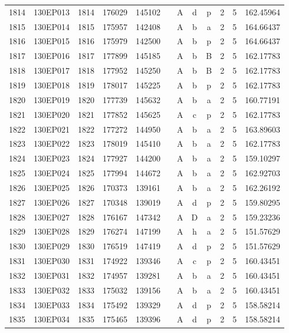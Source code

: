 \begin{tabular}{|*{12}{c|}}
1814 & 130EP013 & 1814 & 176029 & 145102 &  & A & d & p & 2 & 5 & 162.45964 \\ 
1815 & 130EP014 & 1815 & 175957 & 142408 &  & A & b & a & 2 & 5 & 164.66437 \\ 
1816 & 130EP015 & 1816 & 175979 & 142500 &  & A & b & p & 2 & 5 & 164.66437 \\ 
1817 & 130EP016 & 1817 & 177899 & 145185 &  & A & b & B & 2 & 5 & 162.17783 \\ 
1818 & 130EP017 & 1818 & 177952 & 145250 &  & A & b & B & 2 & 5 & 162.17783 \\ 
1819 & 130EP018 & 1819 & 178017 & 145225 &  & A & b & p & 2 & 5 & 162.17783 \\ 
1820 & 130EP019 & 1820 & 177739 & 145632 &  & A & b & a & 2 & 5 & 160.77191 \\ 
1821 & 130EP020 & 1821 & 177852 & 145625 &  & A & c & p & 2 & 5 & 162.17783 \\ 
1822 & 130EP021 & 1822 & 177272 & 144950 &  & A & b & a & 2 & 5 & 163.89603 \\ 
1823 & 130EP022 & 1823 & 178019 & 145410 &  & A & b & a & 2 & 5 & 162.17783 \\ 
1824 & 130EP023 & 1824 & 177927 & 144200 &  & A & b & a & 2 & 5 & 159.10297 \\ 
1825 & 130EP024 & 1825 & 177994 & 144672 &  & A & b & a & 2 & 5 & 162.92703 \\ 
1826 & 130EP025 & 1826 & 170373 & 139161 &  & A & b & a & 2 & 5 & 162.26192 \\ 
1827 & 130EP026 & 1827 & 170348 & 139019 &  & A & d & p & 2 & 5 & 159.80295 \\ 
1828 & 130EP027 & 1828 & 176167 & 147342 &  & A & D & a & 2 & 5 & 159.23236 \\ 
1829 & 130EP028 & 1829 & 176274 & 147199 &  & A & h & a & 2 & 5 & 151.57629 \\ 
1830 & 130EP029 & 1830 & 176519 & 147419 &  & A & d & p & 2 & 5 & 151.57629 \\ 
1831 & 130EP030 & 1831 & 174922 & 139346 &  & A & c & p & 2 & 5 & 160.43451 \\ 
1832 & 130EP031 & 1832 & 174957 & 139281 &  & A & b & a & 2 & 5 & 160.43451 \\ 
1833 & 130EP032 & 1833 & 175032 & 139156 &  & A & b & a & 2 & 5 & 160.43451 \\ 
1834 & 130EP033 & 1834 & 175492 & 139329 &  & A & d & p & 2 & 5 & 158.58214 \\ 
1835 & 130EP034 & 1835 & 175465 & 139396 &  & A & d & p & 2 & 5 & 158.58214 \\ 

\end{tabular}
